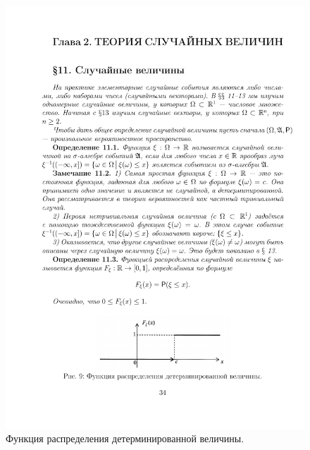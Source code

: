 \begin{figure}[h!]
	\centering
	\includegraphics[]{pic/pic9}
	\caption{Функция распределения детерминированной величины.}
	\label{fig9}
\end{figure}

